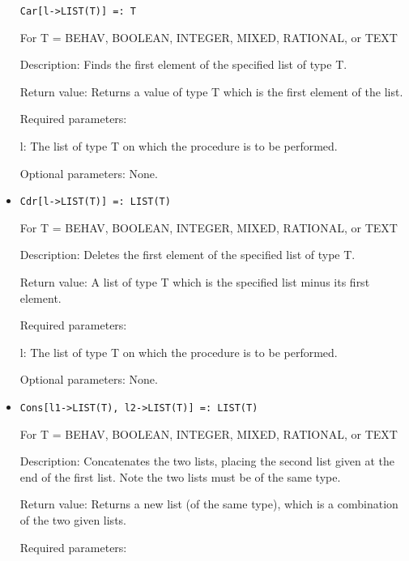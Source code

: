 \begin{itemize}
\protect \large \begin{verbatim}
Car[l->LIST(T)] =: T	
\end{verbatim}\normalsize

For T = BEHAV, BOOLEAN, INTEGER, MIXED, RATIONAL, or TEXT 

\bd
\item
[Description:] Finds the first element of the specified list of type T.
\item
[Return value:] Returns a value of type T which is the first element
of the list.
\item 
[Required parameters:]\hfil\null
	
\bd
\item
[l:] The list of type T on which the procedure is to be performed.
\ed

\item
[Optional parameters:] None.
\ed

\item

\protect \large \begin{verbatim}
Cdr[l->LIST(T)] =: LIST(T)
\end{verbatim}\normalsize

For T = BEHAV, BOOLEAN, INTEGER, MIXED, RATIONAL, or TEXT

\bd
\item
[Description:] Deletes the first element of the specified list of type T.
\item 
[Return value:] A list of type T which is the specified list minus its
first element.
\item   
[Required parameters:]\hfil\null

\bd
\item
[ l:] The list of type T on which the procedure is to be performed.
\ed
\item
[Optional parameters:] None.
\ed

\item

\protect \large \begin{verbatim}
Cons[l1->LIST(T), l2->LIST(T)] =: LIST(T)
\end{verbatim}\normalsize

For T = BEHAV, BOOLEAN, INTEGER, MIXED, RATIONAL, or TEXT

\bd
\item
[Description:] Concatenates the two lists, placing the second list given
at the end of the first list.  Note the two lists must be of the same type.
\item 
[Return value:] Returns a new list (of the same type), which is a 
combination of the two given lists.
\item
[Required parameters:]\hfil\null


\end{itemize}
